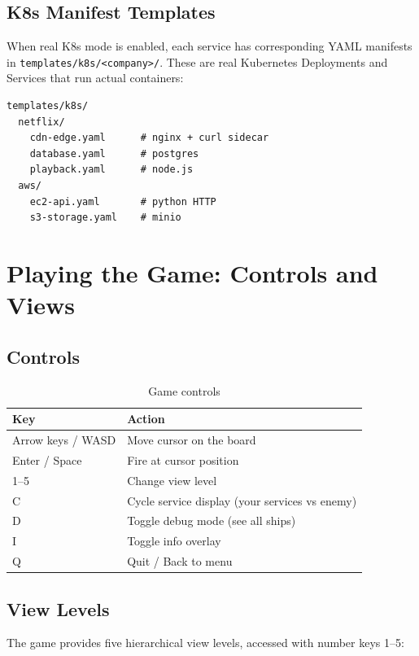 \documentclass[11pt]{article}
\begin{document}
\subsection{K8s Manifest Templates}

When real K8s mode is enabled, each service has corresponding YAML manifests in \texttt{templates/k8s/<company>/}. These are real Kubernetes Deployments and Services that run actual containers:

\begin{verbatim}
templates/k8s/
  netflix/
    cdn-edge.yaml      # nginx + curl sidecar
    database.yaml      # postgres
    playback.yaml      # node.js
  aws/
    ec2-api.yaml       # python HTTP
    s3-storage.yaml    # minio
\end{verbatim}


\section{Playing the Game: Controls and Views}


\subsection{Controls}

\begin{table}[H]
\centering
\begin{tabular}{@{}ll@{}}
\toprule
\textbf{Key} & \textbf{Action} \\
\midrule
Arrow keys / WASD & Move cursor on the board \\
Enter / Space & Fire at cursor position \\
1--5 & Change view level \\
C & Cycle service display (your services vs enemy) \\
D & Toggle debug mode (see all ships) \\
I & Toggle info overlay \\
Q & Quit / Back to menu \\
\bottomrule
\end{tabular}
\caption{Game controls}
\label{tab:controls}
\end{table}

\subsection{View Levels}

The game provides five hierarchical view levels, accessed with number keys 1--5:
\end{document}
